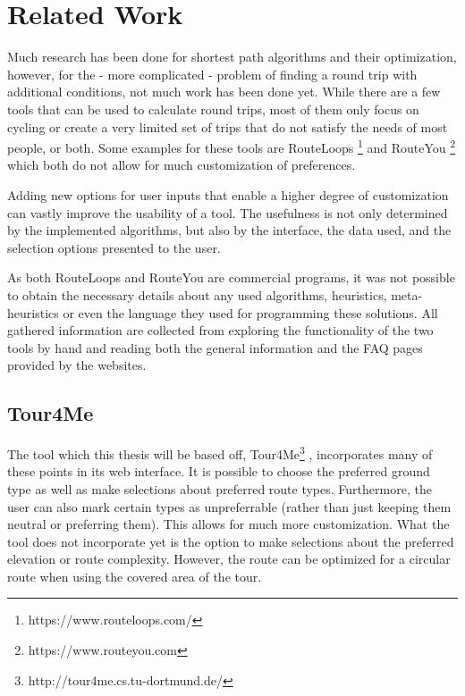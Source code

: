 \chapter{Related Work}
\label{chapter:relatedWork}


Much research has been done for shortest path algorithms and their optimization, however, for the - more complicated \cite{gemsa_efficient_2013} - problem of finding a round trip with additional conditions, not much work has been done yet.
While there are a few tools that can be used to calculate round trips, most of them only focus on cycling or create a very limited set of trips that do not satisfy the needs of most people, or both. 
Some examples for these tools are RouteLoops \footnote{https://www.routeloops.com/} and RouteYou \footnote{https://www.routeyou.com} which both do not allow for much customization of preferences. 

Adding new options for user inputs that enable a higher degree of customization can vastly improve the usability of a tool. 
The usefulness is not only determined by the implemented algorithms, but also by the interface, the data used, and the selection options presented to the user. 

As both RouteLoops and RouteYou are commercial programs, it was not possible to obtain the necessary details about any used algorithms, heuristics, meta-heuristics or even the language they used for programming these solutions.
All gathered information are collected from exploring the functionality of the two tools by hand and reading both the general information and the FAQ pages provided by the websites. 

\section{Tour4Me}
\label{sec:Tour4Me}

The tool which this thesis will be based off, Tour4Me\footnote{http://tour4me.cs.tu-dortmund.de/} \cite{buchin_tour4me_2022}, incorporates many of these points in its web interface. 
It is possible to choose the preferred ground type as well as make selections about preferred route types.
Furthermore, the user can also mark certain types as unpreferrable (rather than just keeping them neutral or preferring them).
This allows for much more customization.
What the tool does not incorporate yet is the option to make selections about the preferred elevation or route complexity.
However, the route can be optimized for a circular route when using the covered area of the tour. 

